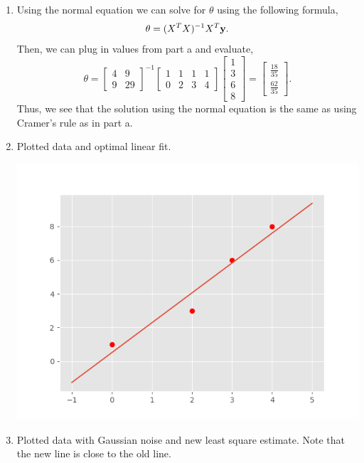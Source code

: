 \documentclass[12pt,letterpaper]{hmcpset}
\begin{document}
\begin{solution}
\begin{enumerate}
\newpage
\item Using the normal equation we can solve for $\theta$ using the following formula,
$$\theta = (X^TX)^{-1}X^T{\bf y}.$$ Then, we can plug in values from part a and evaluate, $$\theta = \begin{bmatrix}
	4 & 9\\
	9 & 29
\end{bmatrix}^{-1} \begin{bmatrix}
	1 & 1 & 1 & 1\\
	0 & 2 & 3 & 4
\end{bmatrix}\begin{bmatrix}
1 \\
3 \\
6 \\
8
\end{bmatrix} = \begin{bmatrix}
\frac{18}{35}\\
\frac{62}{35}
\end{bmatrix}.$$
Thus, we see that the solution using the normal equation is the same as using Cramer's rule as in part a.

\item Plotted data and optimal linear fit.

\includegraphics{hw1pr2c.png}
\newpage
\item Plotted data with Gaussian noise and new least square estimate. Note that the new line is close to the old line.


\end{enumerate}
\end{solution}
\end{document}
